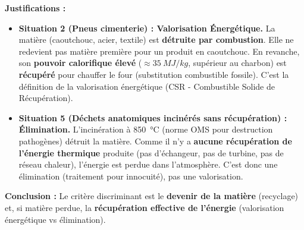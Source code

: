\documentclass[11pt]{article}
\begin{document}
\begin{exoresolu}
\textbf{Justifications :}
\begin{itemize}
    \item \textbf{Situation 2 (Pneus cimenterie) : Valorisation Énergétique.} La matière (caoutchouc, acier, textile) est \textbf{détruite par combustion}. Elle ne redevient pas matière première pour un produit en caoutchouc. En revanche, son \textbf{pouvoir calorifique élevé} ($\approx \SI{35}{MJ/kg}$, supérieur au charbon) est \textbf{récupéré} pour chauffer le four (substitution combustible fossile). C'est la définition de la valorisation énergétique (CSR - Combustible Solide de Récupération).
    \item \textbf{Situation 5 (Déchets anatomiques incinérés sans récupération) : Élimination.} L'incinération à \SI{850}{\celsius} (norme OMS pour destruction pathogènes) détruit la matière. Comme il n'y a \textbf{aucune récupération de l'énergie thermique} produite (pas d'échangeur, pas de turbine, pas de réseau chaleur), l'énergie est perdue dans l'atmosphère. C'est donc une élimination (traitement pour innocuité), pas une valorisation.
\end{itemize}
\textbf{Conclusion :} Le critère discriminant est le \textbf{devenir de la matière} (recyclage) et, si matière perdue, la \textbf{récupération effective de l'énergie} (valorisation énergétique vs élimination).
\end{exoresolu}
\end{document}
